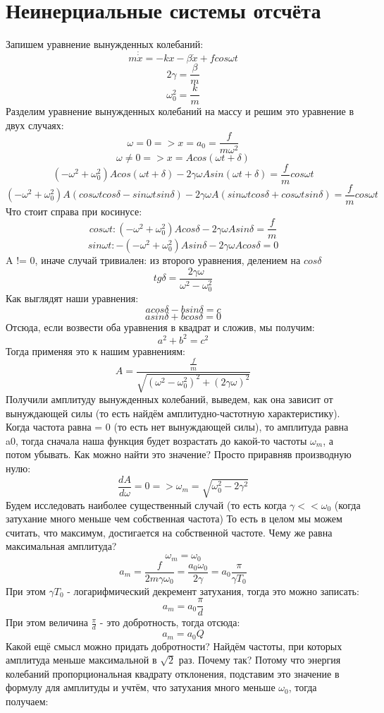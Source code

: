 \section{Неинерциальные системы отсчёта}
Запишем уравнение вынужденных колебаний:
\[m\dot \dot x = -kx - \beta \dot x + fcos\omega t\]
\[2\gamma = \frac{\beta}{m}\]
\[\omega_0^2 = \frac{k}{m}\]
Разделим уравнение вынужденных колебаний на массу и решим это уравнение в двух случаях:
\[\omega = 0 => x = a_0 = \frac{f}{m\omega^2}\]
\[\omega \ne 0 => x = Acos(\omega t + \delta)\]
\[(-\omega^2 + \omega_0^2)Acos(\omega t +\delta) - 2\gamma \omega A sin(\omega t + \delta) = \frac{f}{m}cos\omega t\]
\[(-\omega^2 + \omega_0^2)A(cos\omega tcos\delta - sin \omega t sin \delta) - 2\gamma \omega A(sin \omega t cos \delta + cos \omega t sin \delta) = \frac{f}{m}cos\omega t\]
Что стоит справа при косинусе:
\[cos \omega t : (-\omega^2 + \omega_0^2)Acos\delta - 2\gamma \omega A sin\delta = \frac{f}{m}\]
\[sin \omega t: -(-\omega^2 + \omega_0^2)Asin\delta - 2\gamma \omega A cos\delta = 0\]
A != 0, иначе случай тривиален:
из второго уравнения, делением на $cos \delta$
\[tg \delta = \frac{2\gamma \omega}{\omega^2 - \omega_0^2}\]
Как выглядят наши уравнения:
\[acos\delta - bsin\delta = c\]
\[asin\delta + bcos\delta = 0\]
Отсюда, если возвести оба уравнения в квадрат и сложив, мы получим:
\[a^2 + b^2 = c^2\]
Тогда применяя это к нашим уравнениям:
\[A = \frac{\frac{f}{m}}{\sqrt{(\omega^2 - \omega_0^2)^2 + (2\gamma \omega)^2}}\]
Получили амплитуду вынужденных колебаний, выведем, как она зависит от вынуждающей силы (то есть найдём амплитудно-частотную характеристику).
Когда частота равна = 0 (то есть нет вынуждающей силы), то амплитуда равна a0, тогда сначала наша функция будет возрастать до какой-то частоты $\omega_m$, а потом убывать.
Как можно найти это значение? Просто приравняв производную нулю:
\[\frac{dA}{d\omega} = 0 => \omega_m = \sqrt{\omega_0^2 - 2\gamma^2}\]
Будем исследовать наиболее существенный случай (то есть когда $\gamma << \omega_0$ (когда затухание много меньше чем собственная частота)
То есть в целом мы можем считать, что максимум, достигается на собственной частоте.
Чему же равна максимальная амплитуда?
\[\omega_m = \omega_0\]
\[a_m = \frac{f}{2m\gamma\omega_0} = \frac{a_0\omega_0}{2\gamma} = a_0\frac{\pi}{\gamma T_0}\]
При этом $\gamma T_0$ - логарифмический декремент затухания, тогда это можно записать:
\[a_m = a_0\frac{\pi}{d}\]
При этом величина $\frac{\pi}{d}$ - это добротность, тогда отсюда:
\[a_m = a_0Q\]
Какой ещё смысл можно придать добротности? Найдём частоты, при которых амплитуда меньше максимальной в $\sqrt{2}$ раз. Почему так? Потому что энергия колебаний пропорциональная квадрату отклонения, подставим это значение в формулу для амплитуды и учтём, что затухания много меньше $\omega_0$, тогда получаем:
